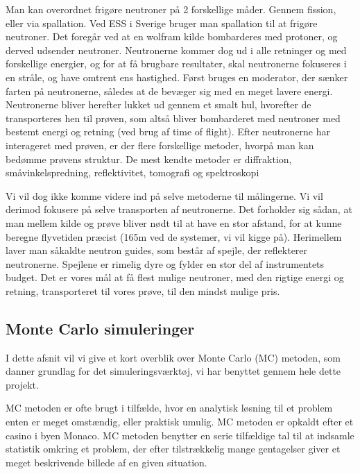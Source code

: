 \documentclass[12pt,oneside,a4paper]{article}
\begin{document}
{{{{{Man kan overordnet frigøre neutroner på 2 forskellige måder. Gennem fission, eller via spallation. Ved ESS i Sverige bruger man spallation til at frigøre neutroner. Det foregår ved at en wolfram kilde bombarderes med protoner, og derved udsender neutroner. Neutronerne kommer dog ud i alle retninger og med forskellige energier, og for at få brugbare resultater, skal neutronerne fokuseres i en stråle, og have omtrent ens hastighed. Først bruges en moderator, der sænker farten på neutronerne, således at de bevæger sig med en meget lavere energi. Neutronerne bliver herefter lukket ud gennem et smalt hul, hvorefter de transporteres hen til prøven, som altså bliver bombarderet med neutroner med bestemt energi og retning (ved brug af time of flight). Efter neutronerne har interageret med prøven, er der flere forskellige metoder, hvorpå man kan bedømme prøvens struktur. De mest kendte metoder er diffraktion, småvinkelspredning, reflektivitet, tomografi og spektroskopi \cite{ess_folder}

Vi vil dog ikke komme videre ind på selve metoderne til målingerne. Vi vil derimod fokusere på selve transporten af neutronerne. Det forholder sig sådan, at man mellem kilde og prøve bliver nødt til at have en stor afstand, for at kunne beregne flyvetiden præcist (165m ved de systemer, vi vil kigge på). Herimellem laver man såkaldte neutron guides, som består af spejle, der reflekterer neutronerne. Spejlene er rimelig dyre og fylder en stor del af instrumentets budget. Det er vores mål at få flest mulige neutroner, med den rigtige energi og retning, transporteret til vores prøve, til den mindst mulige pris.


\subsection{Monte Carlo simuleringer}
I dette afsnit vil vi give et kort overblik over Monte Carlo (MC) metoden, som danner grundlag for det simuleringsværktøj, vi har benyttet gennem hele dette projekt.

MC metoden er ofte brugt i tilfælde, hvor en analytisk løsning til et problem enten er meget omstændig, eller praktisk umulig. MC metoden er opkaldt efter et casino i byen Monaco. MC metoden benytter en serie tilfældige tal til at indsamle statistik omkring et problem, der efter tilstrækkelig mange gentagelser giver et meget beskrivende billede af en given situation.

}}}}}
\end{document}
